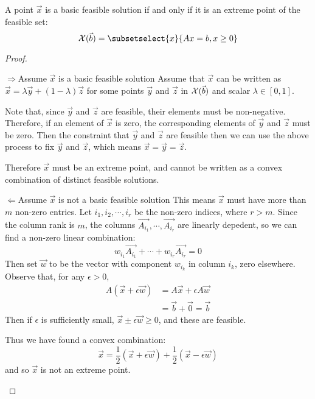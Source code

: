 \documentclass[../Main.tex]{subfiles}
\begin{document}
\begin{theorem}
    A point $\vec{x}$ is a basic feasible solution if and only if it is an extreme point of the feasible set:
    \begin{equation*}
        \Xset(\vec{b}) = \subsetselect{x}{Ax = b, x \geq 0}
    \end{equation*}
\end{theorem}
\begin{proof}
    \begin{proofdirection}{$\Rightarrow$}{Assume $\vec{x}$ is a basic feasible solution}
        Assume that $\vec{x}$ can be written as $\vec{x} = \lambda \vec{y} + (1-\lambda) \vec{z}$ for some points $\vec{y}$ and $\vec{z}$ in $\mathcal{X}(\vec{b})$ and scalar $\lambda \in [0, 1]$.

        Note that, since $\vec{y}$ and $\vec{z}$ are feasible, their elements must be non-negative. Therefore, if an element of $\vec{x}$ is zero, the corresponding elements of $\vec{y}$ and $\vec{z}$ must be zero. Then the constraint that $\vec{y}$ and $\vec{z}$ are feasible then we can use the above process to fix $\vec{y}$ and $\vec{z}$, which means $\vec{x} = \vec{y} = \vec{z}$.

        Therefore $\vec{x}$ must be an extreme point, and cannot be written as a convex combination of distinct feasible solutions.
    \end{proofdirection}
    \begin{proofdirection}{$\Leftarrow$}{Assume $\vec{x}$ is not a basic feasible solution}
        This means $\vec{x}$ must have more than $m$ non-zero entries. Let $i_1, i_2, \cdots, i_r$ be the non-zero indices, where $r > m$. Since the column rank is $m$, the columns $\vec{A_{i_1}}, \cdots, \vec{A_{i_r}}$ are linearly depedent, so we can find a non-zero linear combination:
        \begin{equation*}
            w_{i_1} \vec{A_{i_1}} + \cdots + w_{i_r} \vec{A_{i_r}} = 0
        \end{equation*}
        Then set $\vec{w}$ to be the vector with component $w_{i_k}$ in column $i_k$, zero elsewhere. Observe that, for any $\epsilon > 0$,
        \begin{align*}
            A(\vec{x} + \epsilon \vec{w}) &= A\vec{x} + \epsilon A \vec{w} \\
            &= \vec{b} + \vec{0} = \vec{b}
        \end{align*}
        Then if $\epsilon$ is sufficiently small, $\vec{x} \pm \epsilon \vec{w} \geq 0$, and these are feasible.

        Thus we have found a convex combination:
        \begin{equation*}
            \vec{x} = \frac{1}{2} \left(\vec{x} + \epsilon \vec{w}\right) + \frac{1}{2} \left(\vec{x} - \epsilon \vec{w}\right)
        \end{equation*}
        and so $\vec{x}$ is not an extreme point.
    \end{proofdirection}
\end{proof}
\end{document}
